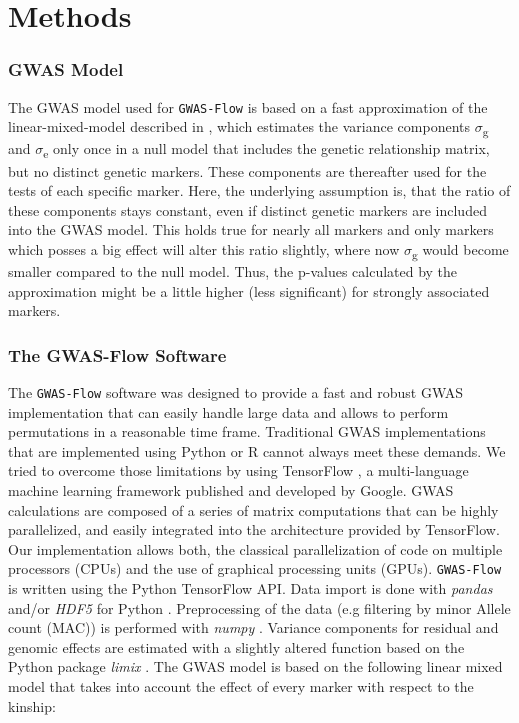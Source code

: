 \section{Methods}

\subsubsection{GWAS Model}
The GWAS model used for \texttt{GWAS-Flow} is based on a fast approximation of the linear-mixed-model
described in \cite{kang2010variance,Zhang2010}, which estimates the variance components
$\sigma$\textsubscript{g} and $\sigma$\textsubscript{e} only once in a null model that includes the genetic
relationship matrix, but no distinct genetic markers. These components are thereafter used for the tests of
each specific marker. Here, the underlying assumption is, that the ratio of these components stays constant,
even if distinct genetic markers are included into the GWAS model. This holds true for nearly all markers and
only markers which posses a big effect will alter this ratio slightly, where now $\sigma$\textsubscript{g}
would become smaller compared to the null model. Thus, the p-values calculated by the approximation might be a
little higher (less significant) for strongly associated markers.

\subsubsection{The GWAS-Flow Software}
The \texttt{GWAS-Flow} software was designed to provide a fast and robust GWAS implementation that can easily
handle large data and allows to perform permutations in a reasonable time frame. Traditional GWAS
implementations that are implemented using Python \cite{van1995python} or R \cite{R} cannot always meet these
demands. We tried to overcome those limitations by using TensorFlow \cite{tensorflow2015-whitepaper}, a
multi-language machine learning framework published and developed by Google. GWAS calculations are composed of
a series of matrix computations that can be highly parallelized, and easily integrated into the architecture
provided by TensorFlow. Our implementation allows both, the classical parallelization of code on multiple
processors (CPUs) and the use of graphical processing units (GPUs). \texttt{GWAS-Flow} is written using the
Python TensorFlow API. Data import is done with \textit{pandas} \cite{mckinney-proc-scipy-2010} and/or
\textit{HDF5} for Python \cite{hdf5_2014}. Preprocessing of the data (e.g filtering by minor Allele count
(MAC)) is performed with \textit{numpy} \cite{oliphant2006guide}. Variance components for residual and
genomic effects are estimated with a slightly altered function based on the Python package \textit{limix}
\cite{Lippert003905}. The GWAS model is based on the following linear mixed model that takes into account the
effect of every marker with respect to the kinship:

